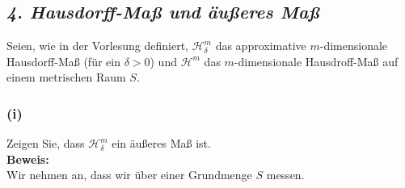 \subsection*{\itshape 4. Hausdorff-Maß und äußeres Maß}

Seien, wie in der Vorlesung definiert, $\mathcal{H}^m_\delta$ das approximative $m$-dimensionale Hausdorff-Maß (für ein $\delta > 0$) und $\mathcal{H}^m$ das $m$-dimensionale Hausdroff-Maß auf einem metrischen Raum $S$.

\subsubsection*{(i)}

Zeigen Sie, dass $\mathcal{H}^m_\delta$ ein äußeres Maß ist.\\

\textbf{Beweis:}\\

Wir nehmen an, dass wir über einer Grundmenge $S$ messen.

